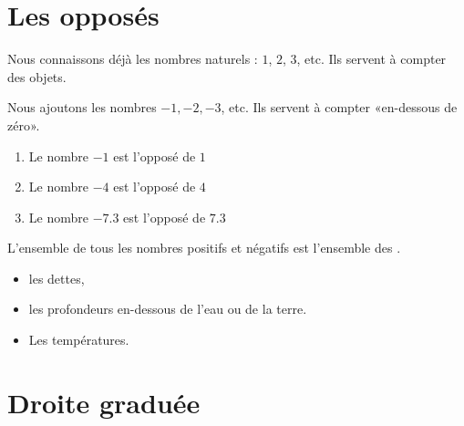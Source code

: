 



\section{Les opposés}

Nous connaissons déjà les nombres naturels : \( 1\), \( 2\), \( 3\), etc. Ils servent à compter des objets.
\begin{definition}
    Nous ajoutons les nombres \( -1, -2, -3\), etc. Ils servent à compter «en-dessous de zéro». 

    \begin{enumerate}
        \item
            Le nombre \( -1\) est l'opposé de \( 1\)
        \item
            Le nombre \( -4\) est l'opposé de \( 4\)
        \item
            Le nombre \( -7.3\) est l'opposé de \( 7.3\)
    \end{enumerate}
\end{definition}

\begin{definition}
    L'ensemble de tous les nombres positifs et négatifs est l'ensemble des .
\end{definition}

\begin{example}
    \begin{itemize}
        \item les dettes,
        \item les profondeurs en-dessous de l'eau ou de la terre.
        \item Les températures.
    \end{itemize}
\end{example}

\section{Droite graduée}


